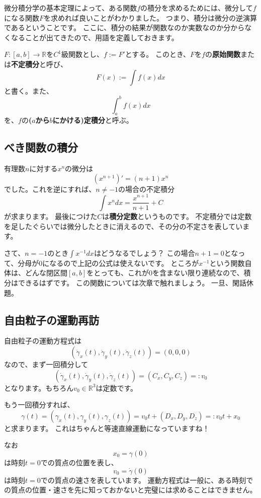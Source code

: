 微分積分学の基本定理によって、ある関数$f$の積分を求めるためには、微分して$f$になる関数$F$を求めれば良いことがわかりました。
つまり、積分は微分の逆演算であるということです。
ここに、積分の結果が関数なのか実数なのか分からなくなることが出てきたので、用語を定義しておきます。
\begin{definition}
  $F:[a,b]\to\mathbb{R}$を$C^1$級関数とし、$f:=F'$とする。
  このとき、$F$を$f$の\textbf{原始関数}または\textbf{不定積分}と呼び、
  \[
    F(x):=\int f(x)dx
  \]
  と書く。また、
  \[
    \int_a^b f(x)dx
  \]
  を、$f$の\textbf{($a$から$b$にかける)定積分}と呼ぶ。
\end{definition}

\subsection{べき関数の積分}

有理数$n$に対する$x^n$の微分は
\[
  (x^{n+1})'=(n+1)x^n
\]
でした。これを逆にすれば、$n\neq-1$の場合の不定積分
\[
  \int x^n dx=\frac{x^{n+1}}{n+1}+C
\]
が求まります。
最後につけた$C$は\textbf{積分定数}というものです。
不定積分では定数を足したぐらいでは微分したときに消えるので、その分の不定さを表しています。

さて、$n=-1$のとき$\int x^{-1}dx$はどうなるでしょう？
この場合$n+1=0$となって、分母が0になるので上記の公式は使えないです。
ところが$x^{-1}$という関数自体は、どんな閉区間$[a,b]$をとっても、これが0を含まない限り連続なので、積分はできるはずです。
この関数については次章で触れましょう。
一旦、閑話休題。

\subsection{自由粒子の運動再訪}

自由粒子の運動方程式は
\[
  (\ddot\gamma_x(t),\ddot\gamma_y(t),\ddot\gamma_z(t))=(0,0,0)
\]
なので、まず一回積分して
\[
  (\dot\gamma_x(t),\dot\gamma_y(t),\dot\gamma_z(t))=(C_x,C_y,C_z)=:v_0
\]
となります。もちろん$v_0\in\mathbb{R}^3$は定数です。

もう一回積分すれば、
\[
  \gamma(t)=(\gamma_x(t),\gamma_y(t),\gamma_z(t))=v_0t+(D_x,D_y,D_z)=:v_0t+x_0
\]
と求まります。
これはちゃんと等速直線運動になっていますね！

なお
\[
  x_0=\gamma(0)
\]
は時刻$t=0$での質点の位置を表し、
\[
  v_0=\dot\gamma(0)
\]
は時刻$t=0$での質点の速さを表しています。
運動方程式は一般に、ある時刻での質点の位置・速さを先に知っておかないと完璧には求めることはできません。



